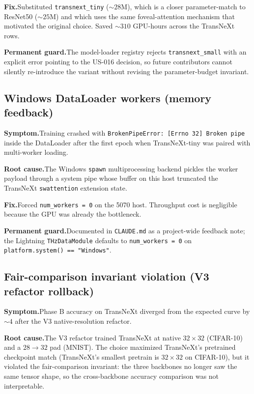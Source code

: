 \textbf{Fix.}\quad Substituted \texttt{transnext\_tiny} ($\sim 28$M),
which is a closer parameter-match to ResNet50 ($\sim 25$M) and which uses
the same foveal-attention mechanism that motivated the original choice.
Saved $\sim 310$ GPU-hours across the TransNeXt rows.

\textbf{Permanent guard.}\quad The model-loader registry rejects
\texttt{transnext\_small} with an explicit error pointing to the US-016
decision, so future contributors cannot silently re-introduce the variant
without revising the parameter-budget invariant.

\subsection{Windows DataLoader workers (memory feedback)}
\textbf{Symptom.}\quad Training crashed with
\texttt{BrokenPipeError: [Errno 32] Broken pipe} inside the DataLoader
after the first epoch when TransNeXt-tiny was paired with multi-worker
loading.

\textbf{Root cause.}\quad The Windows \texttt{spawn} multiprocessing
backend pickles the worker payload through a system pipe whose buffer
on this host truncated the TransNeXt \texttt{swattention} extension
state.

\textbf{Fix.}\quad Forced \texttt{num\_workers = 0} on the 5070 host.
Throughput cost is negligible because the GPU was already the
bottleneck.

\textbf{Permanent guard.}\quad Documented in
\texttt{CLAUDE.md} as a project-wide feedback note; the Lightning
\texttt{THzDataModule} defaults to \texttt{num\_workers = 0} on
\texttt{platform.system() == "Windows"}.

\subsection{Fair-comparison invariant violation (V3 refactor rollback)}
\textbf{Symptom.}\quad Phase B accuracy on TransNeXt diverged from the
expected curve by $\sim 4$ \Mpp{} after the V3 native-resolution
refactor.

\textbf{Root cause.}\quad The V3 refactor trained TransNeXt at native
$32 \times 32$ (CIFAR-10) and a $28 \rightarrow 32$ pad (MNIST). The
choice maximized TransNeXt's pretrained checkpoint match
(TransNeXt's smallest pretrain is $32 \times 32$ on CIFAR-10), but it
violated the fair-comparison invariant: the three backbones no longer
saw the same tensor shape, so the cross-backbone accuracy comparison
was not interpretable.

